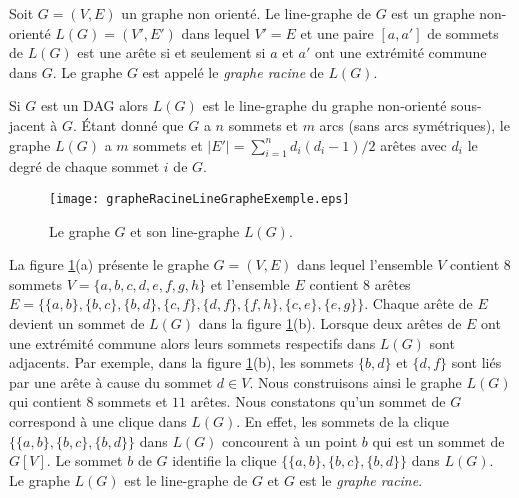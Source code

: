 
\begin{definition}
\label{definitionLineGraphe}
Soit $G = (V, E)$ un graphe non orient\'e.
\newline
Le line-graphe de $G$ est un graphe non-orient\'e $L(G) = (V',E')$ dans lequel 
$V'=E$ et 
une paire $[a,a']$ de sommets de $L(G)$ est une ar\^ete si et seulement si $a$ et $a'$ ont une extr\'emit\'e commune dans $G$.
\newline
Le graphe $G$ est appel\'e le {\em graphe racine} de $L(G)$.
\end{definition}

Si $G$ est un DAG alors  $L(G)$ est le line-graphe du graphe non-orient\'e sous-jacent \`a $G$.
\'Etant donn\'e que $G$ a $n$ sommets et $m$ arcs (sans arcs sym\'etriques), le graphe $L(G)$ a $m$ sommets et $|E'| = \sum_{i=1 }^{n} d_i(d_i -1)/2$ ar\^etes avec $d_i$ le degr\'e de chaque sommet $i$ de $G$.
\vspace{-0.3cm}

\begin{figure}[htb!]\vspace{-0.5em}
	\centering
	\texttt{[image: grapheRacineLineGrapheExemple.eps]}\vspace{-0.5em}
	\caption{ Le graphe $G$ et son line-graphe $L(G)$. 
			}\vspace{-0.5em}
	\label{grapheRacineLineGrapheExemple}
\end{figure}
\FloatBarrier
\vspace{0.3cm}

La figure \ref{grapheRacineLineGrapheExemple}(a) pr\'esente le graphe $G=(V,E)$ dans lequel l'ensemble $V$ contient $8$ sommets $V=\{a,b,c,d,e,f,g,h\}$ et l'ensemble $E$ contient $8$ ar\^etes \\ $E=\{ \{a,b\}, \{b,c\}, \{b,d\}, \{c,f\}, \{d,f\}, \{f,h\}, \{c,e\},\{e,g\} \}$. 
Chaque ar\^ete de $E$ devient un sommet de $L(G)$ dans la figure \ref{grapheRacineLineGrapheExemple}(b). Lorsque deux ar\^etes de $E$ ont une extr\'emit\'e  commune alors leurs sommets respectifs dans $L(G)$  sont adjacents.
Par exemple, dans la figure \ref{grapheRacineLineGrapheExemple}(b), les sommets $\{b,d\}$ et $\{d,f\}$ sont li\'es par une ar\^ete \`a cause du sommet $d \in V$. 
Nous construisons ainsi le graphe $L(G)$  qui contient $8$ sommets et $11$ ar\^etes.
Nous constatons qu'un sommet de $G$ correspond \`a une clique dans $L(G)$. 
En effet, les sommets de la clique $\{ \{a,b\},  \{b,c\},  \{b,d\} \}$ dans $L(G)$ concourent \`a un point $b$ qui est un sommet de $G[V]$. Le sommet  $b$ de $G$  identifie la clique $\{ \{a,b\},  \{b,c\},  \{b,d\} \}$ dans $L(G)$.
Le graphe $L(G)$ est le  line-graphe de $G$ et $G$ est le {\em graphe racine}.
\newline

